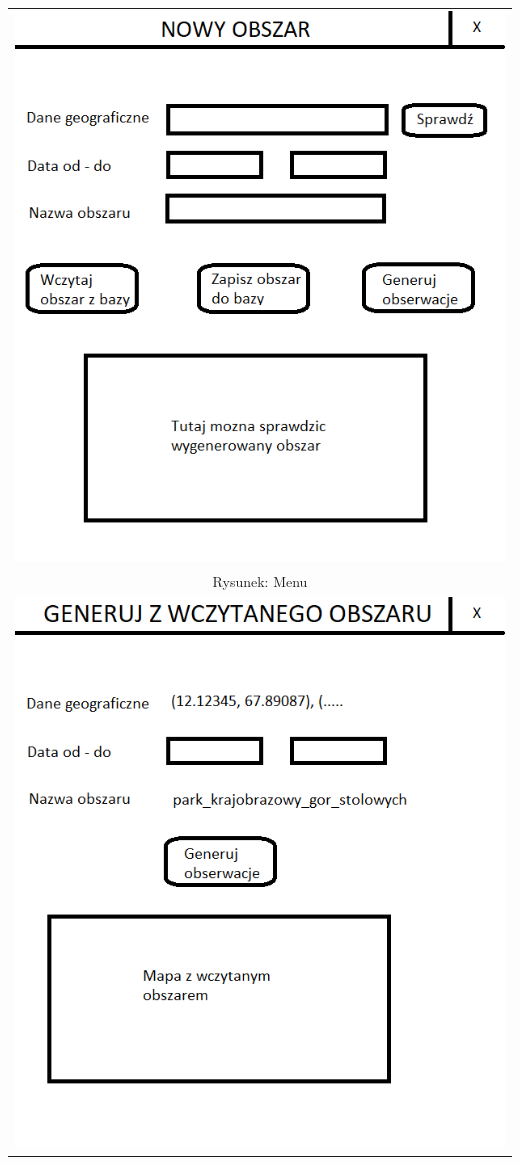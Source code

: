 \documentclass{article}
\begin{document}
\begin{center}
\begin{tabular}{c}
\includegraphics[scale = 0.9]{"nowy obszar.png"}
\\Rysunek: Menu\\
\includegraphics[scale = 0.9]{"generuj z wczytanego obszaru.png"}

\end{tabular}
\end{center}
\end{document}
